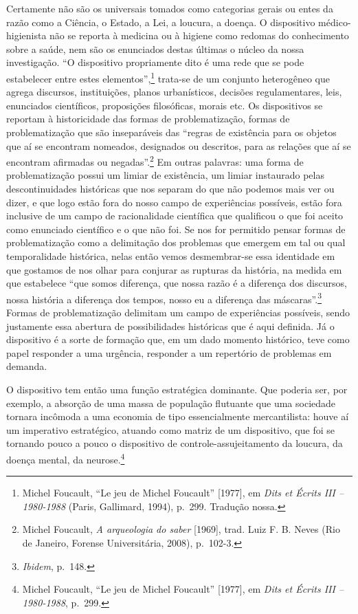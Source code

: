 Certamente não são os universais tomados como categorias gerais ou entes
da razão como a Ciência, o Estado, a Lei, a loucura, a doença. O
dispositivo médico-higienista não se reporta à medicina ou à higiene
como redomas do conhecimento sobre a saúde, nem são os enunciados destas
últimas o núcleo da nossa investigação. ``O dispositivo propriamente
dito é uma rede que se pode estabelecer entre estes
elementos'',\footnote{Michel Foucault, ``Le jeu de Michel Foucault''
  {[}1977{]}, em \emph{Dits et Écrits III -- 1980-1988} (Paris,
  Gallimard, 1994), p.~299. Tradução nossa.} trata-se de um conjunto
heterogêneo que agrega discursos, instituições, planos urbanísticos,
decisões regulamentares, leis, enunciados científicos, proposições
filosóficas, morais etc. Os dispositivos se reportam à historicidade das
formas de problematização, formas de problematização que são
inseparáveis das ``regras de existência para os objetos que aí se
encontram nomeados, designados ou descritos, para as relações que aí se
encontram afirmadas ou negadas''.\footnote{Michel Foucault, \emph{A
  arqueologia do saber} {[}1969{]}, trad. Luiz F. B. Neves (Rio de
  Janeiro, Forense Universitária, 2008), p.~102-3.} Em outras palavras:
uma forma de problematização possui um limiar de existência, um limiar
instaurado pelas descontinuidades históricas que nos separam do que não
podemos mais ver ou dizer, e que logo estão fora do nosso campo de
experiências possíveis, estão fora inclusive de um campo de
racionalidade científica que qualificou o que foi aceito como enunciado
científico e o que não foi. Se nos for permitido pensar formas de
problematização como a delimitação dos problemas que emergem em tal ou
qual temporalidade histórica, nelas então vemos desmembrar-se essa
identidade em que gostamos de nos olhar para conjurar as rupturas da
história, na medida em que estabelece ``que somos diferença, que nossa
razão é a diferença dos discursos, nossa história a diferença dos
tempos, nosso eu a diferença das máscaras''.\footnote{\emph{Ibidem},
  p.~148.} Formas de problematização delimitam um campo de experiências
possíveis, sendo justamente essa abertura de possibilidades históricas
que é aqui definida. Já o dispositivo é a sorte de formação que, em um
dado momento histórico, teve como papel responder a uma urgência,
responder a um repertório de problemas em demanda.

{}

O dispositivo tem então uma função estratégica dominante. Que poderia
ser, por exemplo, a absorção de uma massa de população flutuante que uma
sociedade tornara incômoda a uma economia de tipo essencialmente
mercantilista: houve aí um imperativo estratégico, atuando como matriz
de um dispositivo, que foi se tornando pouco a pouco o dispositivo de
controle-assujeitamento da loucura, da doença mental, da
neurose.\footnote{Michel Foucault, ``Le jeu de Michel Foucault''
  {[}1977{]}, em \emph{Dits et Écrits III -- 1980-1988}, p.~299.}

